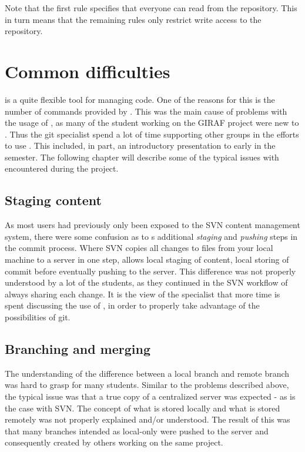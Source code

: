 Note that the first rule specifies that everyone can read from the repository.
This in turn means that the remaining rules only restrict write access to the repository.

\section{Common \git{} difficulties}
\Git{} is a quite flexible tool for managing code.
One of the reasons for this is the number of commands provided by \git{}.
This was the main cause of problems with the usage of \git{}, as many of the student working on the GIRAF project were new to \git{}.
Thus the git specialist spend a lot of time supporting other groups in the efforts to use \git{}.
This included, in part, an introductory presentation to \git{} early in the semester.
The following chapter will describe some of the typical issues with \git{} encountered during the project.

\subsection{Staging content}
As most users had previously only been exposed to the SVN content management system, there were some confusion as to \git{}s additional \textit{staging} and \textit{pushing} steps in the commit process.
Where SVN copies all changes to files from your local machine to a server in one step, \git{} allows local staging of content, local storing of commit before eventually pushing to the server.
This difference was not properly understood by a lot of the students, as they continued in the SVN workflow of always sharing each change.
It is the view of the \git{} specialist that more time is spent discussing the use of \git{}, in order to properly take advantage of the possibilities of git.

\subsection{Branching and merging}
The understanding of the difference between a local branch and remote branch was hard to grasp for many students.
Similar to the problems described above, the typical issue was that a true copy of a centralized server was expected - as is the case with SVN.
The concept of what is stored locally and what is stored remotely was not properly explained and/or understood.
The result of this was that many branches intended as local-only were pushed to the server and consequently created by others working on the same project.

